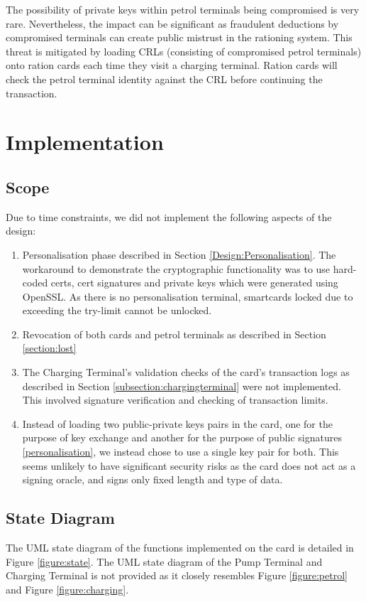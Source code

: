 \documentclass[a4paper,10pt]{llncs}
\begin{document}
The possibility of private keys within petrol terminals being compromised is very rare. Nevertheless, the impact can be significant as fraudulent deductions by compromised terminals can create public mistrust in the rationing system. This threat is mitigated by loading CRLs (consisting of compromised petrol terminals) onto ration cards each time they visit a charging terminal. Ration cards will check the petrol terminal identity against the CRL before continuing the transaction.

\section{Implementation}

\subsection{Scope}
Due to time constraints, we did not implement the following aspects of the design:
\begin{enumerate}
 \item Personalisation phase described in Section \ref{Design:Personalisation}. The workaround to demonstrate the cryptographic functionality was to use hard-coded certs, cert signatures and private keys which were generated using OpenSSL. As there is no personalisation terminal, smartcards locked due to exceeding the try-limit cannot be unlocked.
  \item Revocation of both cards and petrol terminals as described in Section \ref{section:lost} 
  \item The Charging Terminal's validation checks of the card's transaction logs as described in Section \ref{subsection:chargingterminal} were not implemented. This involved signature verification and checking of transaction limits.
  \item Instead of loading two public-private keys pairs in the card, one for the purpose of key exchange and another for the purpose of public signatures \ref{personalisation}, we instead chose to use a single key pair for both. This seems unlikely to have significant security risks as the card does not act as a signing oracle, and signs only fixed length and type of data.
\end{enumerate}

\subsection{State Diagram}
The UML state diagram of the functions implemented on the card is detailed in Figure \ref{figure:state}. The UML state diagram of the Pump Terminal and Charging Terminal is not provided as it closely resembles Figure \ref{figure:petrol} and Figure \ref{figure:charging}.
\end{document}
